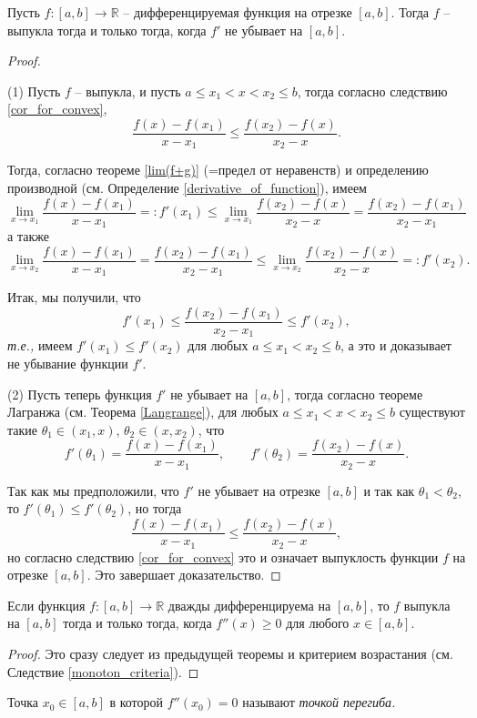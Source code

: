 \begin{theorem}
    Пусть $f: [a,b] \to \mathbb{R}$ -- дифференцируемая функция на отрезке $[a,b]$. Тогда $f$ -- выпукла тогда и только тогда, когда $f'$ не убывает на $[a,b]$.
\end{theorem}
\begin{proof}~

(1) Пусть $f$ -- выпукла,  и пусть $a \le x_1 < x < x_2 \le b$, тогда согласно следствию \ref{cor_for_convex}, 
\[
 \frac{f(x) - f(x_1)}{x-x_1} \le \frac{f(x_2) -  f(x)}{x_2- x}.
\]

Тогда, согласно теореме \ref{lim(f+g)} (=предел от неравенств) и определению производной (см. Определение \ref{derivative_of_function}), имеем
\[
 \lim_{x \to x_1} \frac{f(x) - f(x_1)}{x-x_1} =:f'(x_1) \le \lim_{x \to x_1} \frac{f(x_2) -  f(x)}{x_2- x} = \frac{f(x_2) -  f(x_1)}{x_2- x_1}
\]
а также 
\[
 \lim_{x \to x_2}  \frac{f(x) - f(x_1)}{x-x_1} =  \frac{f(x_2) - f(x_1)}{x_2-x_1} \le \lim_{x\to x_2} \frac{f(x_2) -  f(x)}{x_2- x} =: f'(x_2).
\]

Итак, мы получили, что 
\[
 f'(x_1) \le \frac{f(x_2) -  f(x_1)}{x_2- x_1} \le f'(x_2), 
\]
\textit{т.е.,} имеем $f'(x_1) \le f'(x_2)$ для любых $a \le x_1  < x_2 \le b$, а это и доказывает не убывание функции $f'.$

(2) Пусть теперь функция $f'$ не убывает на $[a,b]$, тогда согласно теореме Лагранжа (см. Теорема \ref{Langrange}), для любых $a \le x_1 < x < x_2 \le b$ существуют такие $\theta_1 \in (x_1, x)$, $\theta_2 \in (x,x_2)$, что
\[
 f'(\theta_1) = \frac{f(x) - f(x_1)}{x-x_1}, \qquad f'(\theta_2) = \frac{f(x_2) - f(x)}{x_2-x}.
\]

Так как мы предположили, что $f'$ не убывает на отрезке $[a,b]$ и так как $\theta_1 < \theta_2$, то $f'(\theta_1) \le f'(\theta_2)$, но тогда
\[
 \frac{f(x) - f(x_1)}{x-x_1} \le \frac{f(x_2) - f(x)}{x_2-x},
\]
но согласно следствию \ref{cor_for_convex} это и означает выпуклость функции $f$ на отрезке $[a,b].$ Это завершает доказательство.
\end{proof}

\begin{corollary}
    Если функция $f:[a,b] \to \mathbb{R}$ дважды дифференцируема на $[a,b]$, то $f$ выпукла на $[a,b]$ тогда и только тогда, когда $f''(x) \ge 0$ для любого $x \in [a,b].$
\end{corollary}
\begin{proof}
    Это сразу следует из предыдущей теоремы и критерием возрастания (см. Следствие \ref{monoton_criteria}).
\end{proof}

\begin{definition}
    Точка $x_0 \in [a,b]$ в которой $f''(x_0) =0$ называют \textit{точкой перегиба.}
\end{definition}
